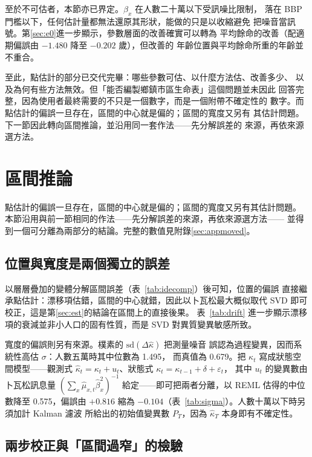 \documentclass[UTF8, fontset=macnew, a4paper, 12pt]{ctexart}
\begin{document}
至於不可估者，本節亦已界定。$\beta_x$ 在人數二十萬以下受訊噪比限制，
落在 BBP 門檻以下，任何估計量都無法還原其形狀，能做的只是以收縮避免
把噪音當訊號。第\ref{sec:e0}進一步顯示，參數層面的改善確實可以轉為
平均餘命的改善（配適期偏誤由 $-1.480$ 降至 $-0.202$ 歲），但改善的
年齡位置與平均餘命所重的年齡並不重合。

至此，點估計的部分已交代完畢：哪些參數可估、以什麼方法估、改善多少、
以及為何有些方法無效。但「能否編製鄉鎮市區生命表」這個問題並未因此
回答完整，因為使用者最終需要的不只是一個數字，而是一個附帶不確定性的
數字。而點估計的偏誤一旦存在，區間的中心就是偏的；區間的寬度又另有
其估計問題。下一節因此轉向區間推論，並沿用同一套作法——先分解誤差的
來源，再依來源選方法。

\section{區間推論}\label{sec:interval}

點估計的偏誤一旦存在，區間的中心就是偏的；區間的寬度又另有其估計問題。
本節沿用與前一節相同的作法——先分解誤差的來源，再依來源選方法——
並得到一個可分離為兩部分的結論。完整的數值見附錄\ref{sec:appmoved}。

\subsection{位置與寬度是兩個獨立的誤差}\label{sec:isrc}

以層層疊加的變體分解區間誤差（表~\ref{tab:idecomp}）後可知，位置的偏誤
直接繼承點估計：漂移項估錯，區間的中心就錯，因此以卜瓦松最大概似取代
SVD 即可校正，這是第\ref{sec:est}的結論在區間上的直接後果。
表~\ref{tab:drift} 進一步顯示漂移項的衰減並非小人口的固有性質，而是
SVD 對異質變異敏感所致。

寬度的偏誤則另有來源。樸素的 $\mathrm{sd}(\Delta\hat\kappa)$ 把測量噪音
誤認為過程變異，因而系統性高估 $\sigma$：人數五萬時其中位數為 1.495，
而真值為 0.679。把 $\kappa_t$ 寫成狀態空間模型——觀測式
$\hat\kappa_t=\kappa_t+u_t$、狀態式 $\kappa_t=\kappa_{t-1}+\delta+\varepsilon_t$，
其中 $u_t$ 的變異數由卜瓦松訊息量 $(\sum_x\hat\mu_{x,t}\hat\beta_x^2)^{-1}$
給定——即可把兩者分離，以 REML 估得的中位數降至 0.575，偏誤由 $+0.816$
縮為 $-0.104$（表~\ref{tab:sigma}）。人數十萬以下時另須加計 Kalman 濾波
所給出的初始值變異數 $P_T$，因為 $\hat\kappa_T$ 本身即有不確定性。

\subsection{兩步校正與「區間過窄」的檢驗}
\end{document}
